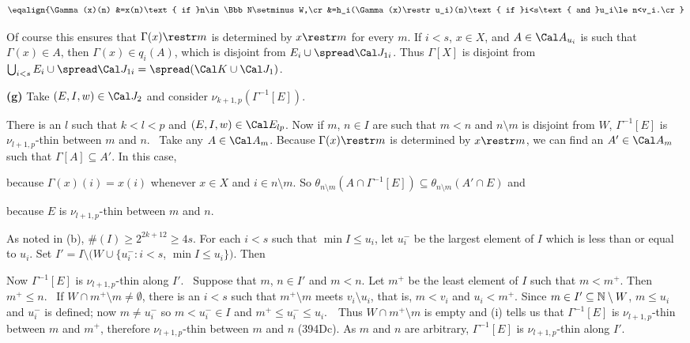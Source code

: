 {$$\eqalign{\Gamma(x)(n)
&=x(n)\text{ if }n\in\Bbb N\setminus W,\cr
&=h_i(\Gamma(x)\restr u_i)(n)\text{ if }i<s\text{ and }u_i\le n<v_i.\cr}$$

\noindent Of course this ensures that $\Gamma(x)\restr m$ is determined by
$x\restr m$ for every $m$.   If $i<s$, $x\in X$, and $A\in\Cal A_{u_i}$ is
such that
$\Gamma(x)\in A$, then $\Gamma(x)\in q_i(A)$, which is disjoint from
$E_i\cup\spread\Cal J_{1i}$.   Thus $\Gamma[X]$ is disjoint from
$\bigcup_{i<s}E_i\cup\spread\Cal J_{1i}=\spread(\Cal K\cup\Cal J_1)$.\ \Qed

\medskip

{\bf (g)} Take $(E,I,w)\in\Cal J_2$ and consider
$\nu_{k+1,p}(\Gamma^{-1}[E])$.   

\medskip

 There is an $l$ such that $k<l<p$
and $(E,I,w)\in\Cal E_{lp}$.
Now if $m$, $n\in I$ are such that $m<n$ and
$n\setminus m$ is disjoint from $W$, $\Gamma^{-1}[E]$ is
$\nu_{l+1,p}$-thin between $m$ and $n$.   \Prf\ Take any $A\in\Cal A_m$.
Because $\Gamma(x)\restr m$ is determined by $x\restr m$,
we can find an $A'\in\Cal A_m$ such that $\Gamma[A]\subseteq A'$.
In this case,


\noindent because $\Gamma(x)(i)=x(i)$ whenever $x\in X$ and
$i\in n\setminus m$.   So
$\theta_{n\setminus m}(A\cap\Gamma^{-1}[E])
\subseteq\theta_{n\setminus m}(A'\cap E)$ and


\noindent because $E$ is $\nu_{l+1,p}$-thin between $m$ and $n$.\ \Qed

\medskip

 As noted in (b), $\#(I)\ge 2^{2k+12}\ge 4s$.
For each $i<s$ such that $\min I\le u_i$,
let $u^-_i$ be the largest element of
$I$ which is less than or equal to $u_i$.
Set $I'=I\setminus(W\cup\{u^-_i:i<s$, $\min I\le u_i\})$.   Then


\noindent Now $\Gamma^{-1}[E]$ is $\nu_{l+1,p}$-thin along $I'$.   \Prf\
Suppose
that $m$, $n\in I'$ and $m<n$.   Let $m^+$ be the least element of $I$ such
that $m<m^+$.   Then $m^+\le n$.   \Quer\ If
$W\cap m^+\setminus m\ne\emptyset$,
there is an $i<s$ such that $m^+\setminus m$ meets $v_i\setminus u_i$, that
is, $m<v_i$ and $u_i<m^+$.
Since $m\in I'\subseteq\Bbb N\setminus W$, $m\le u_i$ and $u^-_i$ is
defined;   now $m\ne u^-_i$ so $m<u^-_i\in I$ and $m^+\le u^-_i\le u_i$.\
\BanG\ Thus
$W\cap m^+\setminus m$ is empty and (i) tells us that $\Gamma^{-1}[E]$ is
$\nu_{l+1,p}$-thin between $m$ and $m^+$, therefore
$\nu_{l+1,p}$-thin between $m$ and $n$ (394Dc).   As $m$
and $n$ are arbitrary, $\Gamma^{-1}[E]$ is $\nu_{l+1,p}$-thin
along $I'$.\ \Qed

}
